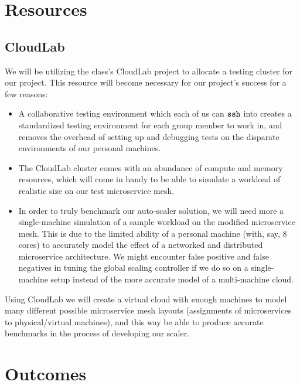 \documentclass{proposal}
\begin{document}
\section{Resources}
\subsection{CloudLab}
We will be utilizing the class's CloudLab project to allocate a testing cluster for our project. This resource will become necessary for our project's success for a few reasons:
\begin{itemize}
    \item A collaborative testing environment which each of us can $\tt ssh$ into creates a standardized testing environment for each group member to work in, and removes the overhead of setting up and debugging tests on the disparate environments of our personal machines.
    \item The CloudLab cluster comes with an abundance of compute and memory resources, which will come in handy to be able to simulate a workload of realistic size on our test microservice mesh.
    \item In order to truly benchmark our auto-scaler solution, we will need more a single-machine simulation of a sample workload on the modified microservice mesh. This is due to the limited ability of a personal machine (with, say, 8 cores) to accurately model the effect of a networked and distributed microservice architecture. We might encounter false positive and false negatives in tuning the global scaling controller if we do so on a single-machine setup instead of the more accurate model of a multi-machine cloud.
\end{itemize}
Using CloudLab we will create a virtual cloud with enough machines to model many different possible microservice mesh layouts (assignments of microservices to physical/virtual machines), and this way be able to produce accurate benchmarks in the process of developing our scaler.

\section{Outcomes}

 
\begin{small}

\end{small}
\end{document}
